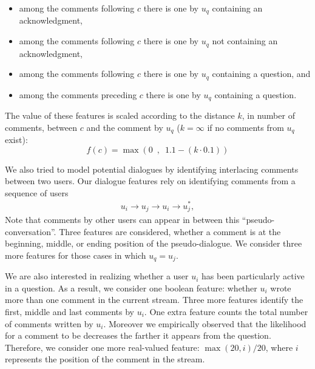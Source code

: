 \begin{itemize}\setlength\itemsep{0em}
\item among the comments following $c$ there is one by $u_q$ containing 
an acknowledgment,
\item among the comments following $c$ there is one by $u_q$ not 
containing an acknowledgment,
\item among the comments following $c$ there is one by $u_q$ containing a 
question, and
\item among the comments preceding $c$ there is one by $u_q$ containing a 
question.
\end{itemize}

The value of these features is scaled according to the distance $k$, in number 
of comments, between $c$ and the comment by $u_q$ ($k=\infty$ if no 
comments from $u_q$ exist):
% 
\begin{equation}
 f(c)=\max \left(0\enspace,\enspace 1.1-(k \cdot 0.1) \right)
\end{equation}
%

We also tried to model potential dialogues by identifying interlacing comments 
between two users. Our dialogue features rely on identifying comments from
a sequence of users 
\begin{align*}
u_i \rightarrow u_j \rightarrow u_i \rightarrow u_j^*,
\end{align*}
% 
Note that comments by other 
users can appear in between this ``pseudo-conversation''. Three features are 
considered, whether a comment is at the beginning, middle, or ending position of 
the pseudo-dialogue. We consider three more features for those cases in which 
$u_q=u_j$. 

We are also interested in realizing whether a user $u_i$ has been particularly 
active in a question. As a result, we consider one boolean feature: whether 
$u_i$ wrote more than one comment in the current stream. Three more features 
identify the first, middle and last comments by $u_i$. One extra feature counts 
the total number of comments written by $u_i$. Moreover we empirically observed 
that the likelihood for a comment to be \good decreases the farther it appears 
from the question. Therefore, we consider one more real-valued feature: 
$\max(20, i)/20$, where $i$ represents the position of the comment in the 
stream.

